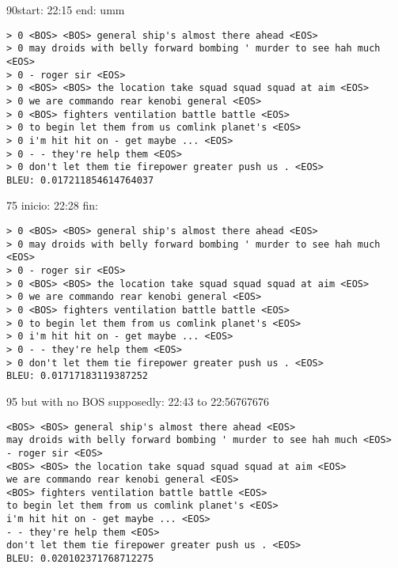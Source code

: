 \documentclass{article}
\begin{document}
90start: 22:15 end: umm
\begin{verbatim}
> 0 <BOS> <BOS> general ship's almost there ahead <EOS>
> 0 may droids with belly forward bombing ' murder to see hah much <EOS>
> 0 - roger sir <EOS>
> 0 <BOS> <BOS> the location take squad squad squad at aim <EOS>
> 0 we are commando rear kenobi general <EOS>
> 0 <BOS> fighters ventilation battle battle <EOS>
> 0 to begin let them from us comlink planet's <EOS>
> 0 i'm hit hit on - get maybe ... <EOS>
> 0 - - they're help them <EOS>
> 0 don't let them tie firepower greater push us . <EOS>
BLEU: 0.017211854614764037
\end{verbatim}

75 inicio: 22:28 fin: 
\begin{verbatim}
> 0 <BOS> <BOS> general ship's almost there ahead <EOS>
> 0 may droids with belly forward bombing ' murder to see hah much <EOS>
> 0 - roger sir <EOS>
> 0 <BOS> <BOS> the location take squad squad squad at aim <EOS>
> 0 we are commando rear kenobi general <EOS>
> 0 <BOS> fighters ventilation battle battle <EOS>
> 0 to begin let them from us comlink planet's <EOS>
> 0 i'm hit hit on - get maybe ... <EOS>
> 0 - - they're help them <EOS>
> 0 don't let them tie firepower greater push us . <EOS>
BLEU: 0.01717183119387252
\end{verbatim}

95 but with no BOS supposedly: 22:43 to 22:56767676
\begin{verbatim}
<BOS> <BOS> general ship's almost there ahead <EOS>
may droids with belly forward bombing ' murder to see hah much <EOS>
- roger sir <EOS>
<BOS> <BOS> the location take squad squad squad at aim <EOS>
we are commando rear kenobi general <EOS>
<BOS> fighters ventilation battle battle <EOS>
to begin let them from us comlink planet's <EOS>
i'm hit hit on - get maybe ... <EOS>
- - they're help them <EOS>
don't let them tie firepower greater push us . <EOS>
BLEU: 0.020102371768712275
\end{verbatim}
\end{document}
